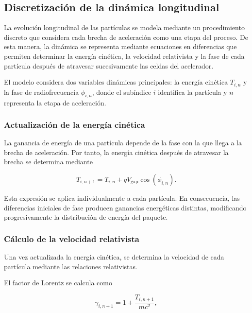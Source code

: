\subsection{Discretización de la dinámica longitudinal}

La evolución longitudinal de las partículas se modela mediante un procedimiento discreto que considera cada brecha de aceleración como una etapa del proceso. De esta manera, la dinámica se representa mediante ecuaciones en diferencias que permiten determinar la energía cinética, la velocidad relativista y la fase de cada partícula después de atravesar sucesivamente las celdas del acelerador.

El modelo considera dos variables dinámicas principales: la energía cinética $T_{i,n}$ y la fase de radiofrecuencia $\phi_{i,n}$, donde el subíndice $i$ identifica la partícula y $n$ representa la etapa de aceleración.

\subsubsection*{Actualización de la energía cinética}

La ganancia de energía de una partícula depende de la fase con la que llega a la brecha de aceleración. Por tanto, la energía cinética después de atravesar la brecha se determina mediante

\begin{equation}
    T_{i,n+1}
    =
    T_{i,n}
    +
    qV_{\mathrm{gap}}\cos(\phi_{i,n}).
\end{equation}

Esta expresión se aplica individualmente a cada partícula. En consecuencia, las diferencias iniciales de fase producen ganancias energéticas distintas, modificando progresivamente la distribución de energía del paquete.

\subsubsection*{Cálculo de la velocidad relativista}

Una vez actualizada la energía cinética, se determina la velocidad de cada partícula mediante las relaciones relativistas.

El factor de Lorentz se calcula como

\begin{equation}
    \gamma_{i,n+1}
    =
    1+\frac{T_{i,n+1}}{mc^2},
\end{equation}

